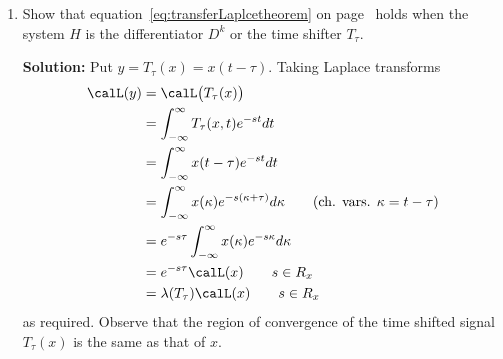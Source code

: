 \documentclass[11pt,a4paper]{book}
\theoremstyle{plain}
\numberwithin{equation}{section}
\newenvironment{solution}{\begin{footnotesize}\textbf{Solution:}}{\end{footnotesize}}
\newenvironment{excersizelist}{%
  \renewcommand*{\theenumi}{\thechapter.\arabic{enumi}}%
  \newcommand\itemadvanced{\stepcounter{enumi}\item[$\ast$\, \theenumi.]}
  \begin{enumerate}
}{%
  \end{enumerate}
}
\begin{document}
\begin{excersizelist}
\item \label{exer:laplacetransdiffandtimeshift} Show that equation~\eqref{eq:transferLaplcetheorem} on page~\pageref{eq:transferLaplcetheorem} holds when the system $H$ is the differentiator $D^k$ or the time shifter $T_\tau$. 
\begin{solution}
Put $y = T_\tau(x) = x(t- \tau)$.  Taking Laplace transforms
\begin{align*}
\calL(y) &= \calL\big(T_\tau(x)\big) \\
&= \int_{-\infty}^{\infty} T_\tau(x,t) e^{-st} dt \\
&= \int_{-\infty}^{\infty} x(t - \tau) e^{-st} dt \\
&= \int_{-\infty}^{\infty} x(\kappa) e^{-s(\kappa + \tau)} d\kappa \qquad \text{(ch. vars. $\kappa = t - \tau$)} \\
&= e^{-s\tau}\int_{-\infty}^{\infty} x(\kappa) e^{-s\kappa} d\kappa \\
&= e^{-s\tau} \calL(x) \qquad s \in R_x \\
&= \lambda(T_\tau) \calL(x) \qquad s \in R_x
\end{align*}
as required.  Observe that the region of convergence of the time shifted signal $T_\tau(x)$ is the same as that of $x$.



\end{solution}
\end{excersizelist}
\end{document}

